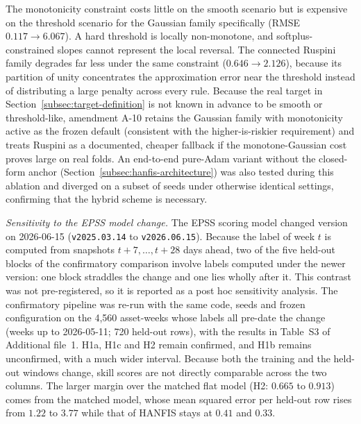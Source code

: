 \documentclass[pdflatex,sn-basic]{sn-jnl}
\theoremstyle{thmstyleone}%
\theoremstyle{thmstyletwo}%
\theoremstyle{thmstylethree}%
\begin{document}
The monotonicity constraint costs little on the smooth scenario but is expensive on the threshold scenario for the Gaussian family specifically (RMSE $0.117\to6.067$). A hard threshold is locally non-monotone, and softplus-constrained slopes cannot represent the local reversal. The connected Ruspini family degrades far less under the same constraint ($0.646\to2.126$), because its partition of unity concentrates the approximation error near the threshold instead of distributing a large penalty across every rule. Because the real target in Section~\ref{subsec:target-definition} is not known in
advance to be smooth or threshold-like, amendment A-10 retains the Gaussian family with monotonicity
active as the frozen default (consistent with the higher-is-riskier requirement) and treats Ruspini as
a documented, cheaper fallback if the monotone-Gaussian cost proves large on real folds. An end-to-end
pure-Adam variant without the closed-form anchor (Section~\ref{subsec:hanfis-architecture}) was also
tested during this ablation and diverged on a subset of seeds under otherwise identical settings,
confirming that the hybrid scheme is necessary.

\emph{Sensitivity to the EPSS model change.} The EPSS scoring model changed version on 2026-06-15
(\texttt{v2025.03.14} to \texttt{v2026.06.15}). Because the label of week $t$ is computed from snapshots
$t{+}7,\dots,t{+}28$ days ahead, two of the five held-out blocks of the confirmatory comparison involve labels
computed under the newer version: one block straddles the change and one lies wholly after it. This contrast
was not pre-registered, so it is reported as a post hoc sensitivity analysis. The confirmatory pipeline was
re-run with the same code, seeds and frozen configuration on the 4{,}560 asset-weeks whose labels all
pre-date the change (weeks up to 2026-05-11; 720 held-out rows), with the results in
Table~S3 of Additional file~1. H1a, H1c and H2 remain confirmed, and H1b remains unconfirmed, with a much wider
interval. Because both the training and the held-out windows change, skill scores are not directly comparable across the two columns. The larger margin over the matched flat model (H2: $0.665$ to $0.913$) comes from the matched
model, whose mean squared error per held-out row rises from $1.22$ to $3.77$ while that of HANFIS stays at $0.41$ and $0.33$.
\end{document}

